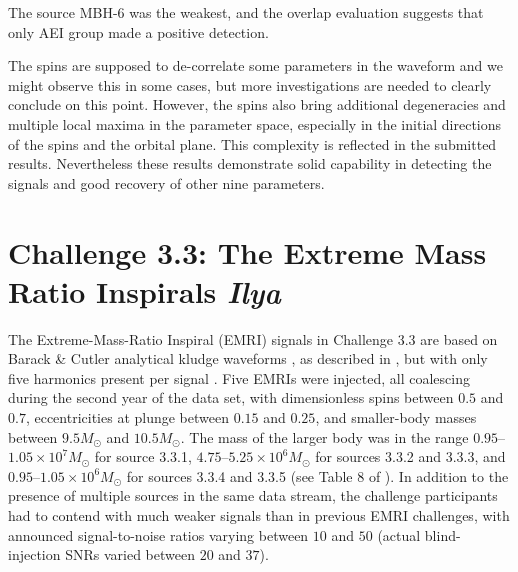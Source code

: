 \documentclass{iopart}
\begin{document}
The source MBH-6 was the weakest, and the overlap evaluation suggests that only AEI group made a positive detection. 

The spins are supposed to de-correlate some parameters in the waveform \cite{SpinBBHLangHugues} and we 
might observe this in some cases, but more investigations are needed to clearly conclude on this point.
However, the spins also bring additional degeneracies and multiple local maxima in the parameter space, especially in the initial directions of the spins and the orbital plane. This complexity is reflected in the submitted results.
Nevertheless these results demonstrate solid capability in detecting the signals and good recovery of other 
nine parameters. 




\section{Challenge 3.3: The Extreme Mass Ratio Inspirals {\it Ilya}}

The Extreme-Mass-Ratio Inspiral (EMRI) signals in Challenge 3.3 are based on Barack \& Cutler analytical kludge waveforms \cite{barackcutler}, as described in \cite{mldcgwdaw2}, but with only five harmonics present per signal \cite{MLDC3}.  Five EMRIs were injected, all coalescing during the second year of the data set, with dimensionless spins between $0.5$ and $0.7$, eccentricities at plunge between $0.15$ and $0.25$, and smaller-body masses between $9.5 M_\odot$ and $10.5 M_\odot$.  The mass of the larger body was in the range $0.95$--$1.05\times10^7 M_\odot$ for source 3.3.1,  $4.75$--$5.25 \times10^6 M_\odot$ for sources 3.3.2 and 3.3.3, and $0.95$--$1.05\times10^6 M_\odot$ for sources 3.3.4 and 3.3.5 (see Table 8 of \cite{MLDC3}).  In addition to the presence of multiple sources in the same data stream, the challenge participants had to contend with much weaker signals than in previous EMRI challenges, with announced signal-to-noise ratios varying between $10$ and $50$ (actual blind-injection SNRs varied between $20$ and $37$).
\end{document}
